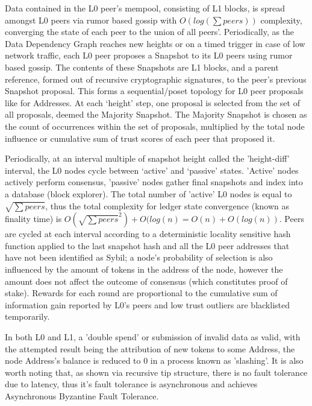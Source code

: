 \documentclass{article}
\begin{document}
Data contained in the L0 peer's mempool, consisting of L1 blocks, is spread amongst L0 peers via rumor based gossip with $O(log(\sum peers))$ complexity, converging the state of each peer to the union of all peers'. Periodically, as the Data Dependency Graph reaches new heights or on a timed trigger in case of low network traffic, each L0 peer proposes a Snapshot to its L0 peers using rumor based gossip. The contents of these Snapshots are L1 blocks, and a parent reference, formed out of recursive cryptographic signatures, to the peer’s previous Snapshot proposal. This forms a sequential/poset topology for L0 peer proposals like for Addresses. At each ‘height’ step, one proposal is selected from the set of all proposals, deemed the Majority Snapshot. The Majority Snapshot is chosen as the count of occurrences within the set of proposals, multiplied by the total  node influence or cumulative sum of trust scores of each peer that proposed it. 
	
Periodically, at an interval multiple of snapshot height called the 'height-diff' interval, the L0 nodes cycle between ‘active’ and ‘passive’ states. 'Active' nodes actively perform consensus, 'passive' nodes gather final snapshots and index into a database (block explorer). The total number of 'active' L0 nodes is equal to $\sqrt{\sum peers}$, thus the total complexity for ledger state convergence (known as finality time) is $O(\sqrt{\sum peers}^2) + O(log(n)= O(n) + O(log(n))$. Peers are cycled at each interval according to a deterministic locality sensitive hash function applied to the last snapshot hash and all the L0 peer addresses that have not been identified as Sybil; a node's probability of selection is also influenced by the amount of tokens in the address of the node, however the amount does not affect the outcome of consensus (which constitutes proof of stake). Rewards for each round are proportional to the cumulative sum of information gain reported by L0’s peers and low trust outliers are blacklisted temporarily.

In both L0 and L1, a 'double spend' or submission of invalid data as valid, with the attempted result being the attribution of new tokens to some Address, the node Address's balance is reduced to 0 in a process known as 'slashing'. It is also worth noting that, as shown via recursive tip structure, there is no fault tolerance due to latency, thus it's fault tolerance is asynchronous and achieves Asynchronous Byzantine Fault Tolerance.
\end{document}
